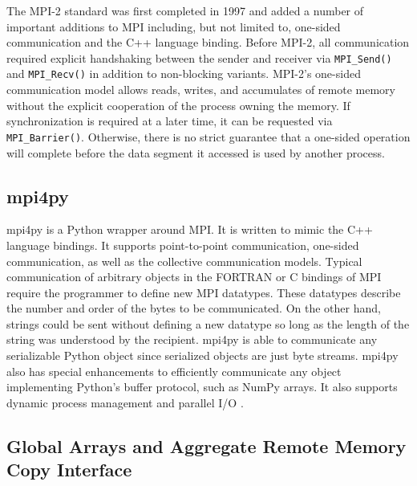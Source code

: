 \documentclass[preprint]{sigplanconf}
\begin{document}
The MPI-2 standard \cite{Gro99b} was first completed in 1997 and added a
number of important additions to MPI including, but not limited to, one-sided
communication and the C++ language binding. Before MPI-2, all communication
required explicit handshaking between the sender and receiver via
\verb=MPI_Send()= and \verb=MPI_Recv()= in addition to non-blocking variants.
MPI-2’s one-sided communication model allows reads, writes, and accumulates of
remote memory without the explicit cooperation of the process owning the
memory. If synchronization is required at a later time, it can be requested
via \verb=MPI_Barrier()=. Otherwise, there is no strict guarantee that a
one-sided operation will complete before the data segment it accessed is used
by another process.

\subsection{mpi4py}

mpi4py is a Python wrapper around MPI. It is written to mimic the C++ language
bindings. It supports point-to-point communication, one-sided communication,
as well as the collective communication models. Typical communication of
arbitrary objects in the FORTRAN or C bindings of MPI require the programmer
to define new MPI datatypes. These datatypes describe the number and order of
the bytes to be communicated. On the other hand, strings could be sent without
defining a new datatype so long as the length of the string was understood by
the recipient.  mpi4py is able to communicate any serializable Python object
since serialized objects are just byte streams. mpi4py also has special
enhancements to efficiently communicate any object implementing Python’s
buffer protocol, such as NumPy arrays. It also supports dynamic process
management and parallel I/O \cite{Dal05,Dal08}.

\subsection{Global Arrays and Aggregate Remote Memory Copy Interface}
\end{document}

